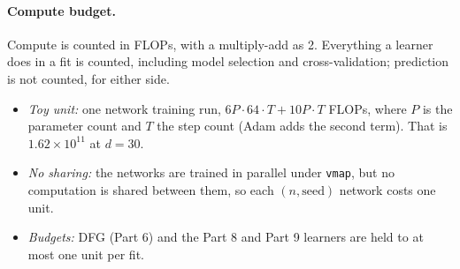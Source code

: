 \paragraph{Compute budget.} Compute is counted in FLOPs, with a multiply-add as 2. Everything a learner does in a fit is counted, including model selection and cross-validation; prediction is not counted, for either side.
\begin{itemize}
\item \emph{Toy unit:} one network training run, $6P\cdot64\cdot T+10P\cdot T$ FLOPs, where $P$ is the parameter count and $T$ the step count (Adam adds the second term). That is $1.62\times10^{11}$ at $d=30$.
\item \emph{No sharing:} the networks are trained in parallel under \texttt{vmap}, but no computation is shared between them, so each $(n,\text{seed})$ network costs one unit.
\item \emph{Budgets:} DFG (Part 6) and the Part 8 and Part 9 learners are held to at most one unit per fit.
\end{itemize}

